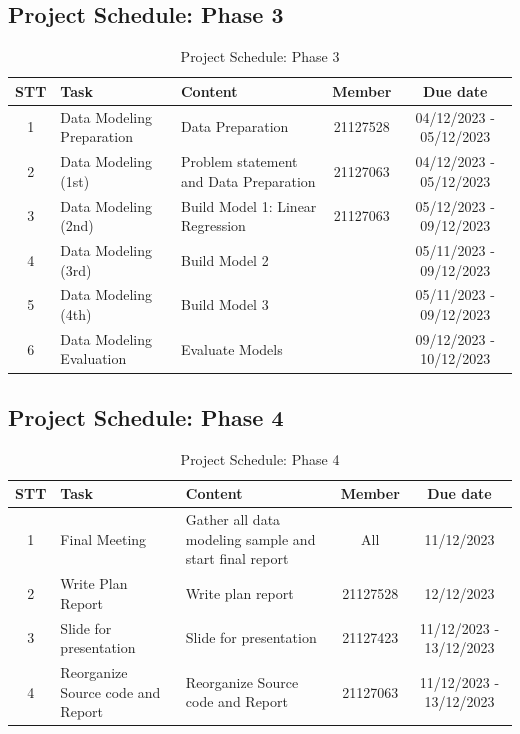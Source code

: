 \documentclass[13pt]{article}
\begin{document}
\subsection{Project Schedule: Phase 3}
\begin{table}[H]
    \centering
    \begin{tabular}{|c|p{4cm}|p{5cm}|c|c|}
    \hline
       \textbf{STT} & \textbf{Task} & \textbf{Content} & \textbf{Member} & \textbf{Due date}\\
    \hline
        1 & Data Modeling Preparation & Data Preparation & 21127528 & 04/12/2023 - 05/12/2023\\
    \hline
        2 & Data Modeling (1st) & Problem statement and Data Preparation & 21127063 & 04/12/2023 - 05/12/2023\\
    \hline
        3 & Data Modeling (2nd) & Build Model 1: Linear Regression & 21127063 & 05/12/2023 - 09/12/2023\\
    \hline
        4 & Data Modeling (3rd) & Build Model 2 &  & 05/11/2023 - 09/12/2023\\
    \hline
        5 & Data Modeling (4th) & Build Model 3 &  & 05/11/2023 - 09/12/2023\\
    \hline
        6 & Data Modeling Evaluation & Evaluate Models &  & 09/12/2023 - 10/12/2023\\
    \hline
    \end{tabular}
    \caption{Project Schedule: Phase 3}
    \label{tab:mytable}
\end{table}


\subsection{Project Schedule: Phase 4}
\begin{table}[h]
    \centering
    \begin{tabular}{|c|p{4cm}|p{5cm}|c|c|}
    \hline
       \textbf{STT} & \textbf{Task} & \textbf{Content} & \textbf{Member} & \textbf{Due date}\\
    \hline
        1 & Final Meeting & Gather all data modeling sample and start final report & All & 11/12/2023\\
    \hline
        2 & Write Plan Report & Write plan report & 21127528 & 12/12/2023\\
    \hline
        3 & Slide for presentation & Slide for presentation & 21127423 & 11/12/2023 - 13/12/2023\\
    \hline
        4 & Reorganize Source code and Report & Reorganize Source code and Report & 21127063 & 11/12/2023 - 13/12/2023\\
    \hline
    \end{tabular}
    \caption{Project Schedule: Phase 4}
    \label{tab:mytable}
\end{table}
\end{document}
